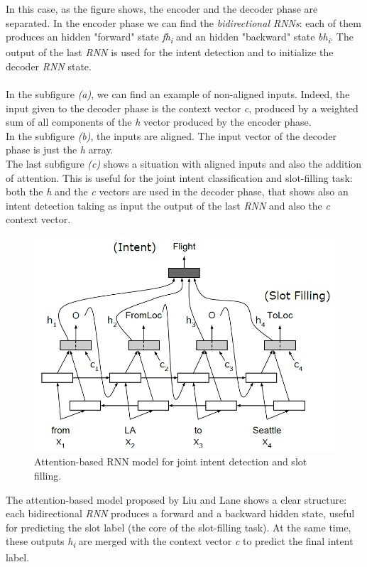 \documentclass[a4paper,12pt]{report}
\begin{document}
	In this case, as the figure shows, the encoder and the decoder phase are separated. In the encoder phase we can find the \textit{bidirectional RNNs}: each of them produces an hidden "forward" state \textit{fh\textsubscript{i}} and an hidden "backward" state \textit{bh\textsubscript{i}}. The output of the last \textit{RNN} is used for the intent detection and to initialize the decoder \textit{RNN} state.\\\\
	In the subfigure \textit{(a)}, we can find an example of non-aligned inputs. Indeed, the input given to the decoder phase is the context vector \textit{c}, produced by a weighted sum of all components of the \textit{h} vector produced by the encoder phase.\\
	In the subfigure \textit{(b)}, the inputs are aligned. The input vector of the decoder phase is just the \textit{h} array.\\
	The last subfigure \textit{(c)} shows a situation with aligned inputs and also the addition of attention. This is useful for the joint intent classification and slot-filling task: both the \textit{h} and the \textit{c} vectors are used in the decoder phase, that shows also an intent detection taking as input the output of the last \textit{RNN} and also the \textit{c} context vector.
	\begin{figure}[H]
		\centering
		\includegraphics[scale=0.4]{alt2}
		\caption{Attention-based RNN model for joint intent detection
			and slot filling.}
	\end{figure}
	The attention-based model proposed by Liu and Lane shows a clear structure: each bidirectional \textit{RNN} produces a forward and a backward hidden state, useful for predicting the slot label (the core of the slot-filling task). At the same time, these outputs \textit{h\textsubscript{i}} are merged with the context vector \textit{c} to predict the final intent label.
	
\end{document}
